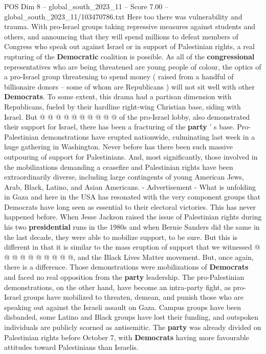 \begin{textsample}{POS Dim 8 – global\_south\_2023\_11 – Score 7.00 – global\_south\_2023\_11/103470786.txt}
Here too there was vulnerability and trauma.
With pro-Israel groups taking repressive measures against students and others, and announcing that they will spend millions to defeat members of Congress who speak out against Israel or in support of Palestinian rights, a real rupturing of the \textbf{Democratic} coalition is possible.
As all of the \textbf{congressional} representatives who are being threatened are young people of colour, the optics of a pro-Israel group threatening to spend money ( raised from a handful of billionaire donors -- some of whom are Republicans ) will not sit well with other \textbf{Democrats}.
To some extent, this drama had a partisan dimension with Republicans, fueled by their hardline right-wing Christian base, siding with Israel.
But @ @ @ @ @ @ @ @ @ @ of the pro-Israel lobby, also demonstrated their support for Israel, there has been a fracturing of the \textbf{party} ' s base.
Pro-Palestinian demonstrations have erupted nationwide, culminating last week in a huge gathering in Washington.
Never before has there been such massive outpouring of support for Palestinians.
And, most significantly, those involved in the mobilizations demanding a ceasefire and Palestinian rights have been extraordinarily diverse, including large contingents of young American Jews, Arab, Black, Latino, and Asian Americans. - Advertisement - What is unfolding in Gaza and here in the USA has resonated with the very component groups that Democrats have long seen as essential to their electoral victories.
This has never happened before.
When Jesse Jackson raised the issue of Palestinian rights during his two \textbf{presidential} runs in the 1980s and when Bernie Sanders did the same in the last decade, they were able to mobilize support, to be sure.
But this is different in that it is similar to the mass eruption of support that we witnessed @ @ @ @ @ @ @ @ @ @, and the Black Lives Matter movement.
But, once again, there is a difference.
Those demonstrations were mobilizations of \textbf{Democrats} and faced no real opposition from the \textbf{party} leadership.
The pro-Palestinian demonstrations, on the other hand, have become an intra-party fight, as pro-Israel groups have mobilized to threaten, demean, and punish those who are speaking out against the Israeli assault on Gaza.
Campus groups have been disbanded, some Latino and Black groups have lost their funding, and outspoken individuals are publicly scorned as antisemitic.
The \textbf{party} was already divided on Palestinian rights before October 7, with \textbf{Democrats} having more favourable attitudes toward Palestinians than Israelis.

\end{textsample}
